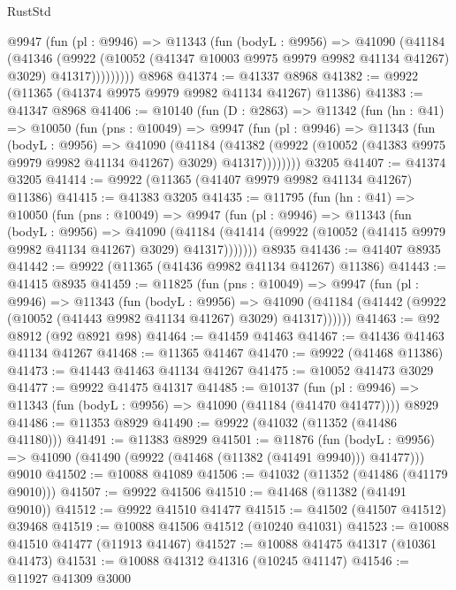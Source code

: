 \begin{lexlean}{RustStd}
\begin{coremodule}
          @9947
            (fun (pl : @9946) =>
            @11343
              (fun (bodyL : @9956) =>
              @41090
                (@41184
                  (@41346
                    (@9922
                      (@10052 (@41347 @10003 @9975 @9979 @9982 @41134 @41267) @3029)
                      @41317)))))))))
    @8968
@41374 := @41337 @8968
@41382 := @9922 (@11365 (@41374 @9975 @9979 @9982 @41134 @41267) @11386)
@41383 := @41347 @8968
@41406 := @10140
    (fun (D : @2863) =>
    @11342
      (fun (hn : @41) =>
      @10050
        (fun (pns : @10049) =>
        @9947
          (fun (pl : @9946) =>
          @11343
            (fun (bodyL : @9956) =>
            @41090
              (@41184
                (@41382
                  (@9922 (@10052 (@41383 @9975 @9979 @9982 @41134 @41267) @3029) @41317))))))))
    @3205
@41407 := @41374 @3205
@41414 := @9922 (@11365 (@41407 @9979 @9982 @41134 @41267) @11386)
@41415 := @41383 @3205
@41435 := @11795
    (fun (hn : @41) =>
    @10050
      (fun (pns : @10049) =>
      @9947
        (fun (pl : @9946) =>
        @11343
          (fun (bodyL : @9956) =>
          @41090
            (@41184 (@41414 (@9922 (@10052 (@41415 @9979 @9982 @41134 @41267) @3029) @41317)))))))
    @8935
@41436 := @41407 @8935
@41442 := @9922 (@11365 (@41436 @9982 @41134 @41267) @11386)
@41443 := @41415 @8935
@41459 := @11825
    (fun (pns : @10049) =>
    @9947
      (fun (pl : @9946) =>
      @11343
        (fun (bodyL : @9956) =>
        @41090 (@41184 (@41442 (@9922 (@10052 (@41443 @9982 @41134 @41267) @3029) @41317))))))
@41463 := @92 @8912 (@92 @8921 @98)
@41464 := @41459 @41463
@41467 := @41436 @41463 @41134 @41267
@41468 := @11365 @41467
@41470 := @9922 (@41468 @11386)
@41473 := @41443 @41463 @41134 @41267
@41475 := @10052 @41473 @3029
@41477 := @9922 @41475 @41317
@41485 := @10137
    (fun (pl : @9946) => @11343 (fun (bodyL : @9956) => @41090 (@41184 (@41470 @41477))))
    @8929
@41486 := @11353 @8929
@41490 := @9922 (@41032 (@11352 (@41486 @41180)))
@41491 := @11383 @8929
@41501 := @11876
    (fun (bodyL : @9956) => @41090 (@41490 (@9922 (@41468 (@11382 (@41491 @9940))) @41477)))
    @9010
@41502 := @10088 @41089
@41506 := @41032 (@11352 (@41486 (@41179 @9010)))
@41507 := @9922 @41506
@41510 := @41468 (@11382 (@41491 @9010))
@41512 := @9922 @41510 @41477
@41515 := @41502 (@41507 @41512) @39468
@41519 := @10088 @41506 @41512 (@10240 @41031)
@41523 := @10088 @41510 @41477 (@11913 @41467)
@41527 := @10088 @41475 @41317 (@10361 @41473)
@41531 := @10088 @41312 @41316 (@10245 @41147)
@41546 := @11927
    @41309
    @3000

\end{coremodule}
\end{lexlean}
